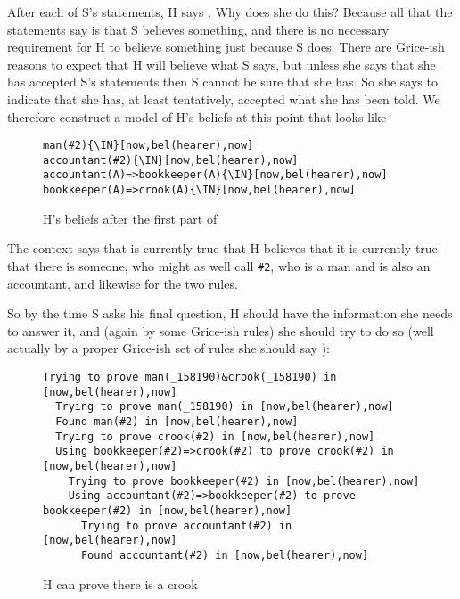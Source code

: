 \documentclass[11pt,a4paper]{article}
\newcommand{\IN}{$\in$}
\begin{document}
After each of S's statements, H says . Why does she do
this? Because all that the statements say is that S believes
something, and there is no necessary requirement for H to believe
something just because S does. There are Grice-ish reasons to expect
that H will believe what S says, but unless she says that she has
accepted S's statements then S cannot be sure that she has. So she
says  to indicate that she has, at least tentatively, accepted
what she has been told. We therefore construct a model of H's beliefs
at this point that looks like 


\begin{figure}[ht]
\begin{center}
\begin{minipage}[t]{0.45\linewidth}
\begin{Verbatim}[commandchars=\\\{\}]
man(#2){\IN}[now,bel(hearer),now]
accountant(#2){\IN}[now,bel(hearer),now]
accountant(A)=>bookkeeper(A){\IN}[now,bel(hearer),now]
bookkeeper(A)=>crook(A){\IN}[now,bel(hearer),now]
\end{Verbatim}
\end{minipage}
\end{center}
\caption{H's beliefs after the first part of }\label{FIG:DIALOGUE:1:a}
\end{figure}

\noindent
The context says that is currently true that H believes that it is
currently true that there is someone, who might as well call
\texttt{\#2}, who is a man and is also an accountant, and likewise for
the two rules.

So by the time S asks his final question, H
should have the information she needs to answer it, and (again by some
Grice-ish rules) she should try to do so (well actually by a proper
Grice-ish set of rules she should say ): 


\begin{figure}[ht]
\begin{center}
\begin{minipage}[t]{\linewidth}
\begin{Verbatim}[commandchars=\\\{\}]
Trying to prove man(_158190)&crook(_158190) in [now,bel(hearer),now]
  Trying to prove man(_158190) in [now,bel(hearer),now]
  Found man(#2) in [now,bel(hearer),now]
  Trying to prove crook(#2) in [now,bel(hearer),now]
  Using bookkeeper(#2)=>crook(#2) to prove crook(#2) in [now,bel(hearer),now]
    Trying to prove bookkeeper(#2) in [now,bel(hearer),now]
    Using accountant(#2)=>bookkeeper(#2) to prove bookkeeper(#2) in [now,bel(hearer),now]
      Trying to prove accountant(#2) in [now,bel(hearer),now]
      Found accountant(#2) in [now,bel(hearer),now]
\end{Verbatim}
\end{minipage}
\end{center}
\caption{H can prove there is a crook}\label{FIG:PROOF:1:a}
\end{figure}
\end{document}

